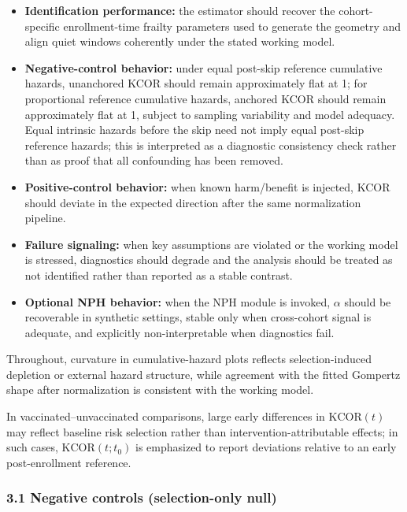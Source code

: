 \documentclass[
]{article}
\providecommand{\tightlist}{%
  \setlength{\itemsep}{0pt}\setlength{\parskip}{0pt}}
\begin{document}
\begin{itemize}
\tightlist
\item
  \textbf{Identification performance:} the estimator should recover the cohort-specific enrollment-time frailty parameters used to generate the geometry and align quiet windows coherently under the stated working model.
\item
  \textbf{Negative-control behavior:} under equal post-skip reference cumulative hazards, unanchored KCOR should remain approximately flat at 1; for proportional reference cumulative hazards, anchored KCOR should remain approximately flat at 1, subject to sampling variability and model adequacy. Equal intrinsic hazards before the skip need not imply equal post-skip reference hazards; this is interpreted as a diagnostic consistency check rather than as proof that all confounding has been removed.
\item
  \textbf{Positive-control behavior:} when known harm/benefit is injected, KCOR should deviate in the expected direction after the same normalization pipeline.
\item
  \textbf{Failure signaling:} when key assumptions are violated or the working model is stressed, diagnostics should degrade and the analysis should be treated as not identified rather than reported as a stable contrast.
\item
  \textbf{Optional NPH behavior:} when the NPH module is invoked, \(\alpha\) should be recoverable in synthetic settings, stable only when cross-cohort signal is adequate, and explicitly non-interpretable when diagnostics fail.
\end{itemize}

Throughout, curvature in cumulative-hazard plots reflects selection-induced depletion or external hazard structure, while agreement with the fitted Gompertz shape after normalization is consistent with the working model.

In vaccinated--unvaccinated comparisons, large early differences in \(\mathrm{KCOR}(t)\) may reflect baseline risk selection rather than intervention-attributable effects; in such cases, \(\mathrm{KCOR}(t; t_0)\) is emphasized to report deviations relative to an early post-enrollment reference.

\subsubsection{3.1 Negative controls (selection-only null)}\label{negative-controls-selection-only-null}
\end{document}
